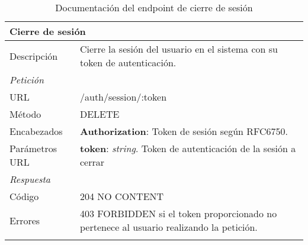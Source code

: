 \begin{longtable}{|p{} p{}|}
    \hline
    \multicolumn{2}{|l|}{\textbf{Cierre de sesión}} \\ \hline 
    Descripción         & Cierre la sesión del usuario en el sistema con su token de autenticación. \\ \hline \hline
    \multicolumn{2}{|l|}{\emph{Petición}}  \\ \hline 
    URL      & /auth/session/:token \\ \hline
    Método   & DELETE                  \\ \hline
    Encabezados  & 
    \textbf{Authorization}: Token de sesión según RFC6750. \\ \hline
    Parámetros URL  & 
    \textbf{token}: \emph{string}. Token de autenticación de la sesión a cerrar \\ \hline \hline
    \multicolumn{2}{|l|}{\emph{Respuesta}} \\ \hline 
    Código          & 204 NO CONTENT          \\ \hline \hline
    Errores & 403 FORBIDDEN si el token proporcionado no pertenece al usuario realizando la petición. 
    \\ \hline
    \caption{Documentación del endpoint de cierre de sesión}
    \label{api:cierre_sesion}
\end{longtable}

